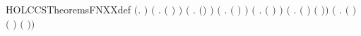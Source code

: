 \begin{SaveVerbatim}{HOLCCSTheoremsFNXXdef}
\HOLTokenTurnstile{} \ensuremath{(}\HOLSymConst{\HOLTokenForall{}}.    \HOLSymConst{\ensuremath{=}} \HOLTokenLeftbrace{}\HOLTokenRightbrace{}\ensuremath{)} \HOLSymConst{\HOLTokenConj{}}
   \ensuremath{(}\HOLSymConst{\HOLTokenForall{}}  .  \ensuremath{(} \HOLSymConst{\ensuremath{\ldotp}}\ensuremath{)}  \HOLSymConst{\ensuremath{=}}     \ensuremath{)} \HOLSymConst{\HOLTokenConj{}}
   \ensuremath{(}\HOLSymConst{\HOLTokenForall{}} .  \ensuremath{(}\HOLConst{\ensuremath{\tau}}\HOLSymConst{\ensuremath{\ldotp}}\ensuremath{)}  \HOLSymConst{\ensuremath{=}}   \ensuremath{)} \HOLSymConst{\HOLTokenConj{}}
   \ensuremath{(}\HOLSymConst{\HOLTokenForall{}}  .  \ensuremath{(} \HOLSymConst{\ensuremath{+}} \ensuremath{)}  \HOLSymConst{\ensuremath{=}}    \HOLConst{\HOLTokenUnion{}}   \ensuremath{)} \HOLSymConst{\HOLTokenConj{}}
   \ensuremath{(}\HOLSymConst{\HOLTokenForall{}}  .  \ensuremath{(} \HOLSymConst{\ensuremath{\mid}} \ensuremath{)}  \HOLSymConst{\ensuremath{=}}    \HOLConst{\HOLTokenUnion{}}   \ensuremath{)} \HOLSymConst{\HOLTokenConj{}}
   \ensuremath{(}\HOLSymConst{\HOLTokenForall{}}  .  \ensuremath{(}  \ensuremath{)}  \HOLSymConst{\ensuremath{=}}     \ensuremath{(} \HOLConst{\HOLTokenUnion{}}   \ensuremath{)}\ensuremath{)} \HOLSymConst{\HOLTokenConj{}}
   \ensuremath{(}\HOLSymConst{\HOLTokenForall{}}  .
         \ensuremath{(}  \ensuremath{)}  \HOLSymConst{\ensuremath{=}}  \ensuremath{(} \ensuremath{)} \ensuremath{(}  \ensuremath{)}\ensuremath{)} \HOLSymConst{\HOLTokenConj{}}

\end{SaveVerbatim}

